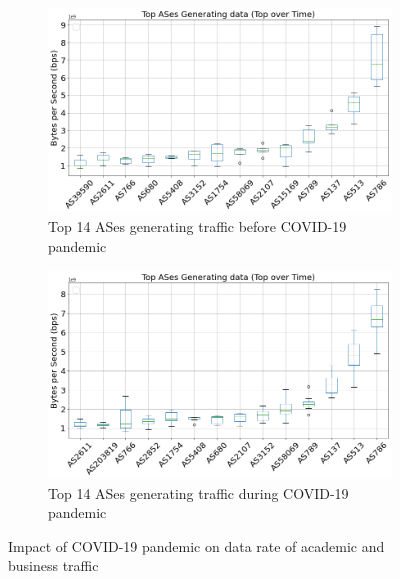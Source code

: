 \documentclass[10pt, journal, letterpaper]{IEEEtran}
\newcommand\figSzeMahdi{0.8}
\begin{document}
\begin{figure}
    \begin{subfigure}{\figSzeMahdi\columnwidth}
          \centering
          \includegraphics[width=\columnwidth]{img/BCO2_top14AS_generating_bps.png}
          \caption{Top 14 ASes generating traffic before COVID-19 pandemic}
          \label{fig:BCO2_topAS_gen_bps}
    \end{subfigure}
    \begin{subfigure}{\figSzeMahdi\columnwidth}
          \centering
          \includegraphics[width=\columnwidth]{img/CO2_top14AS_generating_bps.png}
          \caption{Top 14 ASes generating traffic during COVID-19 pandemic}
          \label{fig:CO2_topAS_gen_bps}
    \end{subfigure}
    \caption{Impact of COVID-19 pandemic on data rate of academic and business traffic}
    \label{fig:topAS_gen_BCO_CO}
\end{figure}
\end{document}
